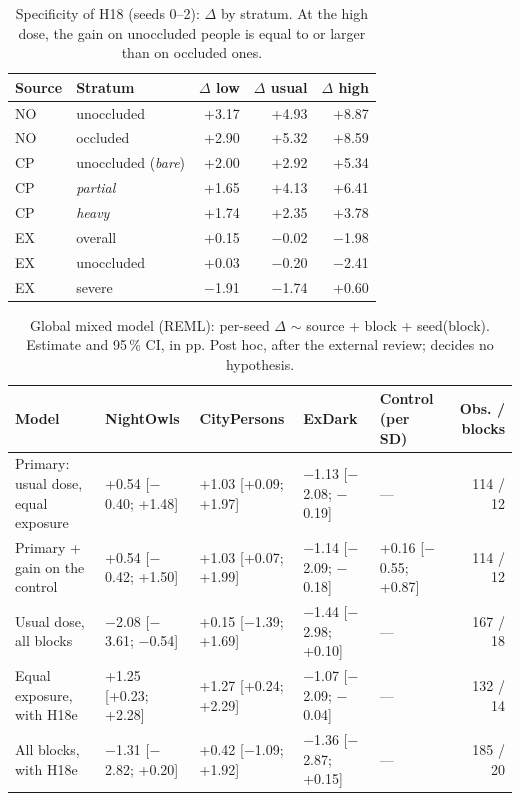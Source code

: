 \begin{table}[H]\centering\small
\caption{Specificity of H18 (seeds 0--2): $\Delta$ by stratum. At the high dose, the gain on unoccluded people is equal to or larger than on occluded ones.}
\begin{tabular}{@{}llrrr@{}}\toprule
Source & Stratum & $\Delta$ low & $\Delta$ usual & $\Delta$ high \\\midrule
NO & unoccluded & +3.17 & +4.93 & +8.87 \\
NO & occluded & +2.90 & +5.32 & +8.59 \\
CP & unoccluded (\emph{bare}) & +2.00 & +2.92 & +5.34 \\
CP & \emph{partial} & +1.65 & +4.13 & +6.41 \\
CP & \emph{heavy} & +1.74 & +2.35 & +3.78 \\
EX & overall & +0.15 & $-$0.02 & $-$1.98 \\
EX & unoccluded & +0.03 & $-$0.20 & $-$2.41 \\
EX & severe & $-$1.91 & $-$1.74 & +0.60 \\
\bottomrule\end{tabular}\end{table}

\begin{table}[H]\centering\small
\caption{Global mixed model (REML): per-seed $\Delta$ $\sim$ source + block + seed(block). Estimate and 95\,\% CI, in pp. Post hoc, after the external review; decides no hypothesis.}
\begin{tabular}{@{}p{2.8cm}llllr@{}}\toprule
Model & NightOwls & CityPersons & ExDark & Control (per SD) & Obs. / blocks \\\midrule
Primary: usual dose, equal exposure & +0.54 [$-$0.40; +1.48] & +1.03 [+0.09; +1.97] & $-$1.13 [$-$2.08; $-$0.19] & --- & 114 / 12 \\
Primary + gain on the control & +0.54 [$-$0.42; +1.50] & +1.03 [+0.07; +1.99] & $-$1.14 [$-$2.09; $-$0.18] & +0.16 [$-$0.55; +0.87] & 114 / 12 \\
Usual dose, all blocks & $-$2.08 [$-$3.61; $-$0.54] & +0.15 [$-$1.39; +1.69] & $-$1.44 [$-$2.98; +0.10] & --- & 167 / 18 \\
Equal exposure, with H18e & +1.25 [+0.23; +2.28] & +1.27 [+0.24; +2.29] & $-$1.07 [$-$2.09; $-$0.04] & --- & 132 / 14 \\
All blocks, with H18e & $-$1.31 [$-$2.82; +0.20] & +0.42 [$-$1.09; +1.92] & $-$1.36 [$-$2.87; +0.15] & --- & 185 / 20 \\
\bottomrule\end{tabular}\end{table}


